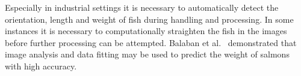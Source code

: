 \documentclass[screen,review]{acmart}
\begin{document}
Especially in industrial settings it is necessary to automatically
detect the orientation, length and weight of fish during handling
and processing.
In some instances it is necessary to computationally straighten the
fish in the images \cite{MuozBenavent2018EnhancedFB} before further
processing can be attempted.
Balaban et al.~\cite{Balaban2010UsingIA} demonstrated that image analysis
and data fitting may be used to predict the weight of salmons with high
accuracy.
\end{document}
